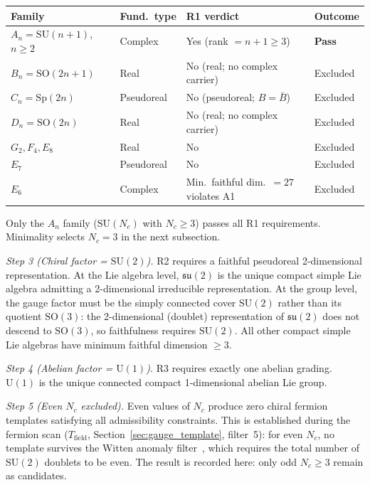 \documentclass[11pt]{article}
\newcommand{\SU}{\mathrm{SU}}
\newcommand{\U}{\mathrm{U}}
\begin{document}
\begin{tcolorbox}[apfbox, title={Lemma $L_{\mathrm{gauge,unique}}$ (Gauge Template Uniqueness)}]
\smallskip
\begin{center}
\small
\begin{tabular}{llp{4.2cm}l}
\toprule
\textbf{Family} & \textbf{Fund.\ type} & \textbf{R1 verdict} & \textbf{Outcome} \\
\midrule
$A_n = \SU(n\!+\!1)$, $n \ge 2$ & Complex & Yes (rank $= n+1 \ge 3$) & \textbf{Pass} \\
$B_n = \mathrm{SO}(2n\!+\!1)$ & Real & No (real; no complex carrier) & Excluded \\
$C_n = \mathrm{Sp}(2n)$ & Pseudoreal & No (pseudoreal; $B = \bar{B}$) & Excluded \\
$D_n = \mathrm{SO}(2n)$ & Real & No (real; no complex carrier) & Excluded \\
$G_2, F_4, E_8$ & Real & No & Excluded \\
$E_7$ & Pseudoreal & No & Excluded \\
$E_6$ & Complex & Min.\ faithful dim.\ $= 27$ violates A1 & Excluded \\
\bottomrule
\end{tabular}
\end{center}
\smallskip

Only the $A_n$ family ($\SU(N_c)$ with $N_c \ge 3$) passes all R1 requirements.  Minimality selects $N_c = 3$ in the next subsection.

\medskip\noindent\textit{Step 3 (Chiral factor = $\SU(2)$).}  R2 requires a faithful pseudoreal 2-dimensional representation.  At the Lie algebra level, $\mathfrak{su}(2)$ is the unique compact simple Lie algebra admitting a 2-dimensional irreducible representation.  At the group level, the gauge factor must be the simply connected cover $\SU(2)$ rather than its quotient $\mathrm{SO}(3)$: the 2-dimensional (doublet) representation of $\mathfrak{su}(2)$ does not descend to $\mathrm{SO}(3)$, so faithfulness requires $\SU(2)$.  All other compact simple Lie algebras have minimum faithful dimension $\ge 3$.

\medskip\noindent\textit{Step 4 (Abelian factor = $\U(1)$).}  R3 requires exactly one abelian grading.  $\U(1)$ is the unique connected compact 1-dimensional abelian Lie group.

\medskip\noindent\textit{Step 5 (Even $N_c$ excluded).}  Even values of $N_c$ produce zero chiral fermion templates satisfying all admissibility constraints.  This is established during the fermion scan ($T_{\mathrm{field}}$, Section~\ref{sec:gauge_template}, filter~5): for even $N_c$, no template survives the Witten anomaly filter~\cite{Witten1982}, which requires the total number of $\SU(2)$ doublets to be even.  The result is recorded here: only odd $N_c \ge 3$ remain as candidates.


\end{tcolorbox}
\end{document}

